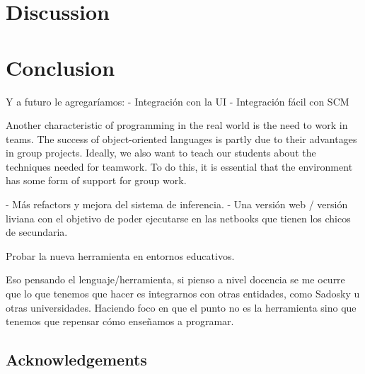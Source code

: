 \documentclass{article}
\begin{document}



\section{Discussion}
\label{sec:discussion}





\section{Conclusion}
\label{sec:conclusion}



Y a futuro le agregaríamos:
- Integración con la UI
- Integración fácil con SCM

Another characteristic of programming in the real world is the need to work in
teams. The success of object-oriented languages is partly due to their advantages in
group projects. Ideally, we also want to teach our students about the techniques
needed for teamwork. To do this, it is essential that the environment has some form
of support for group work. \cite{kolling_problem_1999}

- Más refactors y mejora del sistema de inferencia.
- Una versión web / versión liviana con el objetivo de poder ejecutarse en las netbooks que tienen los chicos de secundaria.

Probar la nueva herramienta en entornos educativos.

Eso pensando el lenguaje/herramienta, si pienso a nivel docencia se me ocurre que lo que tenemos que hacer es integrarnos con otras entidades, como Sadosky u otras universidades.
Haciendo foco en que el punto no es la herramienta sino que tenemos que repensar cómo enseñamos a programar.

\subsection*{Acknowledgements} 
\end{document}
